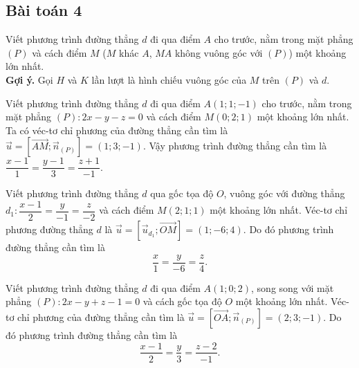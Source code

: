 \subsection{Bài toán 4}
Viết phương trình đường thẳng $d$ đi qua điểm $A$ cho trước, nằm trong mặt phẳng $(P)$ và cách điểm $M$ ($M$ khác $A$, $MA$ không vuông góc với $(P)$) một khoảng lớn nhất.\\
\textbf{Gợi ý.} Gọi $H$ và $K$ lần lượt là hình chiếu vuông góc của $M$ trên $(P)$ và $d$.
{}
\begin{vd}%
Viết phương trình đường thẳng $d$ đi qua điểm $A(1;1;-1)$ cho trước, nằm trong mặt phẳng $(P): 2x-y-z=0$ và cách điểm $M(0;2;1)$ một khoảng lớn nhất. 
\loigiai
{
Ta có véc-tơ chỉ phương của đường thẳng cần tìm là $\vec{u}=\left[\vec{AM};\vec{n}_{(P)}\right]=(1;3;-1)$. Vậy phương trình đường thẳng cần tìm là $\dfrac{x-1}{1}=\dfrac{y-1}{3}=\dfrac{z+1}{-1}$.
}
\end{vd} 
\begin{vd}%
Viết phương trình đường thẳng $d$ qua gốc tọa độ $O$, vuông góc với đường thẳng $d_1:\dfrac{x-1}{2}=\dfrac{y}{-1}=\dfrac{z}{-2}$ và cách điểm $M(2;1;1)$ một khoảng lớn nhất. 
\loigiai
{
Véc-tơ chỉ phương đường thẳng $d$ là $\vec{u}=\left[\vec{u}_{d_1};\vec{OM}\right]=(1;-6;4)$. Do đó phương trình đường thẳng cần tìm là \[\dfrac{x}{1}=\dfrac{y}{-6}=\dfrac{z}{4}.\] 
}
\end{vd} 
\begin{vd}%
Viết phương trình đường thẳng $d$ đi qua điểm $A(1;0;2)$, song song với mặt phẳng $(P): 2x-y+z-1=0$ và cách gốc tọa độ $O$ một khoảng lớn nhất. 
\loigiai
{
Véc-tơ chỉ phương của đường thẳng cần tìm là $\vec{u}=\left[\vec{OA};\vec{n}_{(P)}\right]=(2;3;-1)$. Do đó phương trình đường thẳng cần tìm là \[\dfrac{x-1}{2}=\dfrac{y}{3}=\dfrac{z-2}{-1}.\] 
}
\end{vd} 

